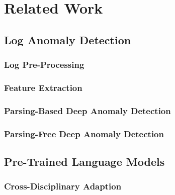 \documentclass[../main.tex]{subfiles}
\begin{document}
\chapter{Related Work}
\label{sec:related_work}
\section{Log Anomaly Detection}
\subsection{Log Pre-Processing}

\subsection{Feature Extraction}

\subsection{Parsing-Based Deep Anomaly Detection}

\subsection{Parsing-Free Deep Anomaly Detection}

\section{Pre-Trained Language Models}
\subsection{Cross-Disciplinary Adaption}
\end{document}
